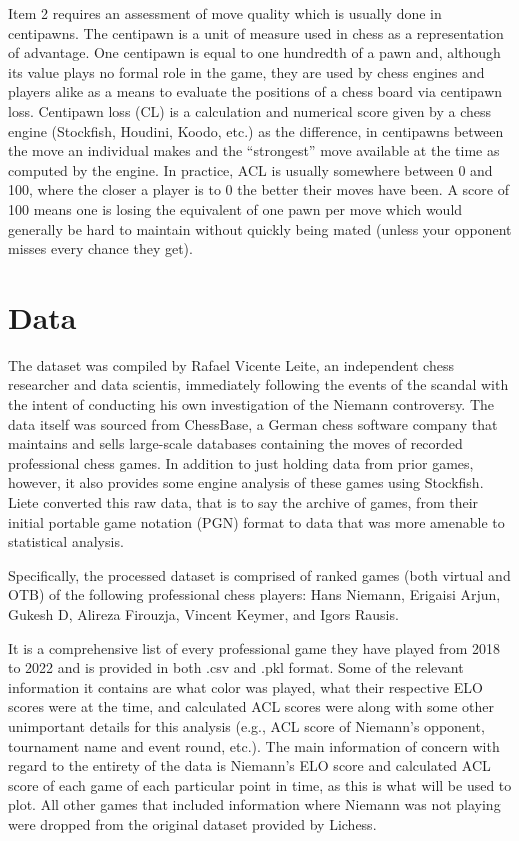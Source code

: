\documentclass[12pt, letterpaper, titlepage]{article}
\begin{document}
Item 2 requires an assessment of move quality which is usually done in centipawns. The centipawn is a unit of measure used in chess as a representation of advantage. One centipawn is equal to one hundredth of a pawn and, although its value plays no formal role in the game, they are used by chess engines and players alike as a means to evaluate the positions of a chess board via centipawn loss. Centipawn loss (CL) is a calculation and numerical score given by a chess engine  (Stockfish, Houdini, Koodo, etc.) as the difference, in centipawns between the move an individual makes and the “strongest” move available at the time as computed by the engine.
In practice, ACL is usually somewhere between 0 and 100, where the closer a player is to 0 the better their moves have been. A score of 100 means one is losing the equivalent of one pawn per move which would generally be hard to maintain without quickly being mated (unless your opponent misses every chance they get).

\section*{Data}
\label{sec:data}

The dataset was compiled by Rafael Vicente Leite, an independent chess researcher and data scientis, immediately following the events of the scandal with the intent of conducting his own investigation of the Niemann controversy. The data itself was sourced from ChessBase, a German chess software company that maintains and sells large-scale databases containing the moves of recorded professional chess games. In addition to just holding data from prior games, however, it also provides some engine analysis of these games using Stockfish. Liete converted this raw data, that is to say the archive of games, from their initial portable game notation (PGN) format to data that was more amenable to statistical analysis.

Specifically, the processed dataset is comprised of ranked games (both virtual and OTB) of the following professional chess players: Hans Niemann, Erigaisi Arjun, Gukesh D, Alireza Firouzja, Vincent Keymer, and Igors Rausis.

It is a comprehensive list of every professional game they have played from 2018 to 2022 and is provided in both .csv and .pkl format. Some of the relevant information it contains are what color was played, what their respective ELO scores were at the time, and calculated ACL scores were along with some other unimportant details for this analysis (e.g., ACL score of Niemann's opponent, tournament name and event round, etc.). The main information of concern with regard to the entirety of the data is Niemann's ELO score and calculated ACL score of each game of each particular point in time, as this is what will be used to plot. All other games that included information where Niemann was not playing were dropped from the original dataset provided by Lichess.
\end{document}
